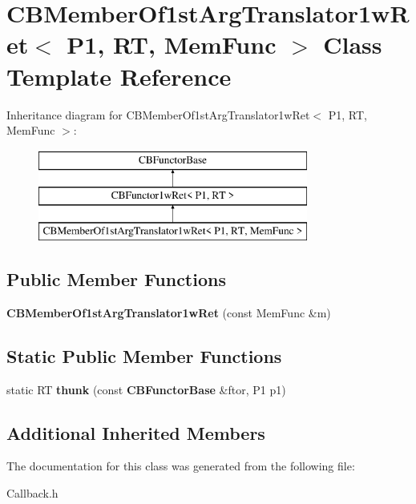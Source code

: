 \section{C\+B\+Member\+Of1st\+Arg\+Translator1w\+Ret$<$ P1, RT, Mem\+Func $>$ Class Template Reference}
\label{classCBMemberOf1stArgTranslator1wRet}
Inheritance diagram for C\+B\+Member\+Of1st\+Arg\+Translator1w\+Ret$<$ P1, RT, Mem\+Func $>$\+:\begin{figure}[H]
\begin{center}
\leavevmode
\includegraphics[height=3.000000cm]{classCBMemberOf1stArgTranslator1wRet}
\end{center}
\end{figure}
\subsection*{Public Member Functions}
\begin{DoxyCompactItemize}
\item 
{\bfseries C\+B\+Member\+Of1st\+Arg\+Translator1w\+Ret} (const Mem\+Func \&m)\label{classCBMemberOf1stArgTranslator1wRet_a6caa8b74e38357ffe68b38662fc97731}

\end{DoxyCompactItemize}
\subsection*{Static Public Member Functions}
\begin{DoxyCompactItemize}
\item 
static RT {\bfseries thunk} (const {\bf C\+B\+Functor\+Base} \&ftor, P1 p1)\label{classCBMemberOf1stArgTranslator1wRet_ab4fcb6d97e3ff9f87f0348822b3926d5}

\end{DoxyCompactItemize}
\subsection*{Additional Inherited Members}


The documentation for this class was generated from the following file\+:\begin{DoxyCompactItemize}
\item 
Callback.\+h\end{DoxyCompactItemize}
